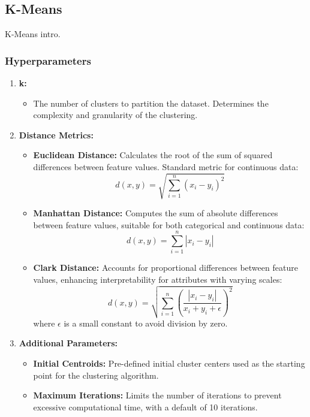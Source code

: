 \subsection{K-Means}\label{sec:kmeans}
K-Means intro.

\subsubsection{Hyperparameters}
\begin{enumerate}
    \item \textbf{k:}
    \begin{itemize}
        \item The number of clusters to partition the dataset. Determines the complexity and granularity of the clustering.
    \end{itemize}
    \item \textbf{Distance Metrics:}
    \begin{itemize}
        \item \textbf{Euclidean Distance:} Calculates the root of the sum of squared differences between feature values. Standard metric for continuous data:
        \[
        d(x, y) = \sqrt{\sum_{i=1}^{n} (x_i - y_i)^2}
        \]
        \item \textbf{Manhattan Distance:} Computes the sum of absolute differences between feature values, suitable for both categorical and continuous data:
        \[
        d(x, y) = \sum_{i=1}^{n} |x_i - y_i|
        \]
        \item \textbf{Clark Distance:} Accounts for proportional differences between feature values, enhancing interpretability for attributes with varying scales:
        \[
        d(x, y) = \sqrt{\sum_{i=1}^{n} \left(\frac{|x_i - y_i|}{x_i + y_i + \epsilon}\right)^2}
        \]
        where $\epsilon$ is a small constant to avoid division by zero.
    \end{itemize}

    \item \textbf{Additional Parameters:}
    \begin{itemize}
        \item \textbf{Initial Centroids:} Pre-defined initial cluster centers used as the starting point for the clustering algorithm.
        \item \textbf{Maximum Iterations:} Limits the number of iterations to prevent excessive computational time, with a default of 10 iterations.
    \end{itemize}
\end{enumerate}

